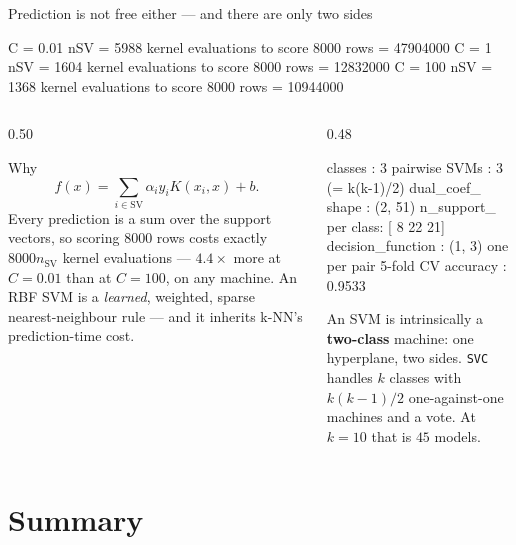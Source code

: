 \documentclass[aspectratio=169]{beamer}
\begin{document}
\begin{frame}[fragile,shrink=13]{Prediction is not free either --- and there are only two sides}
\begin{outblk}
C =   0.01  nSV =  5988  kernel evaluations to score 8000 rows = 47904000
C =      1  nSV =  1604  kernel evaluations to score 8000 rows = 12832000
C =    100  nSV =  1368  kernel evaluations to score 8000 rows = 10944000
\end{outblk}
  \begin{columns}[T]
    \begin{column}{0.50\textwidth}
      \begin{block}{Why}
        \[
          f(x) = \sum_{i \in \mathrm{SV}} \alpha_i y_i K(x_i, x) + b .
        \]
        Every prediction is a sum over the support vectors, so scoring
        $8000$ rows costs exactly $8000 n_{\mathrm{SV}}$ kernel evaluations
        --- $4.4\times$ more at $C = 0.01$ than at $C = 100$, on any machine. An RBF SVM
        is a \emph{learned}, weighted, sparse nearest-neighbour rule --- and
        it inherits k-NN's prediction-time cost.
      \end{block}
    \end{column}
    \begin{column}{0.48\textwidth}
\begin{outblk}
classes            : 3
pairwise SVMs      : 3  (= k(k-1)/2)
dual_coef_ shape   : (2, 51)
n_support_ per class: [ 8 22 21]
decision_function  : (1, 3) one per pair
5-fold CV accuracy : 0.9533
\end{outblk}
      \begin{center}\small
        An SVM is intrinsically a \textbf{two-class} machine: one hyperplane,
        two sides. \texttt{SVC} handles $k$ classes with $k(k-1)/2$
        one-against-one machines and a vote. At $k=10$ that is $45$ models.
      \end{center}
    \end{column}
  \end{columns}
\end{frame}

\section{Summary}
\label{sec:summary}
\end{document}
